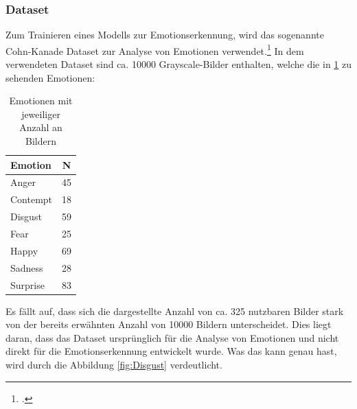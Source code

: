 \documentclass[12pt, a4paper]{scrbook}
\begin{document}
\subsubsection{Dataset}
Zum Trainieren eines Modells zur Emotionserkennung, wird das sogenannte Cohn-Kanade Dataset zur Analyse von Emotionen verwendet.\footcite[Vgl.][]{CK} In dem verwendeten Dataset sind ca. 10000 Grayscale-Bilder enthalten, welche die in \ref{tab:ckemotions} zu sehenden Emotionen:
\begin{table}[h]
\centering
\begin{tabular}[t]{l|c}
Emotion & N \\
\hline
Anger & 45 \\
Contempt & 18 \\
Disgust & 59 \\
Fear & 25 \\
Happy & 69 \\
Sadness & 28 \\
Surprise & 83 \\
\hline
\end{tabular}
\caption{Emotionen mit jeweiliger Anzahl an Bildern}
\label{tab:ckemotions}
\end{table}
Es fällt auf, dass sich die dargestellte Anzahl von ca. 325 nutzbaren Bilder stark von der bereits erwähnten Anzahl von 10000 Bildern unterscheidet. Dies liegt daran, dass das Dataset ursprünglich für die Analyse von Emotionen und nicht direkt für die Emotionserkennung entwickelt wurde. Was das kann genau hast, wird durch die Abbildung \ref{fig:Disgust} verdeutlicht.
\end{document}
